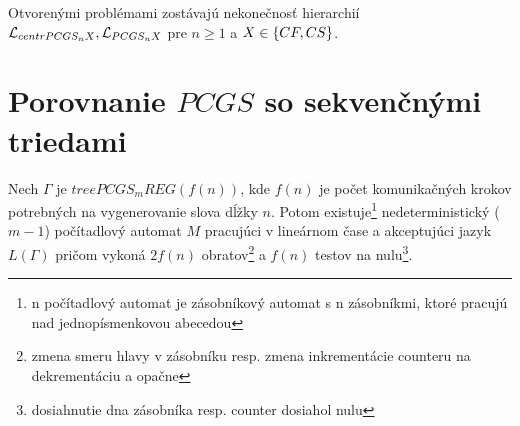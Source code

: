 \begin{poznamka}
  Otvorenými problémami zostávajú nekonečnosť hierarchií\newline
  $\mathcal{L}_{centrPCGS_n X}, \mathcal{L}_{PCGS_n X}$ pre $n\geq 1$ a
  $X \in \{CF, CS\}$.
\end{poznamka}

\section{Porovnanie $PCGS$ so sekvenčnými triedami}

\begin{veta}
  \label{pcgs_veta_multicounter}
  Nech $\Gamma$ je $treePCGS_mREG(f(n))$,
  kde $f(n)$ je počet komunikačných krokov potrebných na
  vygenerovanie slova dĺžky $n$. Potom existuje\footnote{n
  počítadlový automat je zásobníkový automat s n zásobníkmi, ktoré
  pracujú nad jednopísmenkovou abecedou} nedeterministický ($m-1$)
  počítadlový automat $M$ pracujúci v lineárnom čase a akceptujúci
  jazyk $L(\Gamma)$ pričom vykoná $2f(n)$ obratov\footnote{zmena
  smeru hlavy v zásobníku resp. zmena inkrementácie counteru na
  dekrementáciu a opačne} a $f(n)$ testov na
  nulu\footnote{dosiahnutie dna zásobníka resp. counter dosiahol
  nulu}.
\end{veta}

\pagebreak

